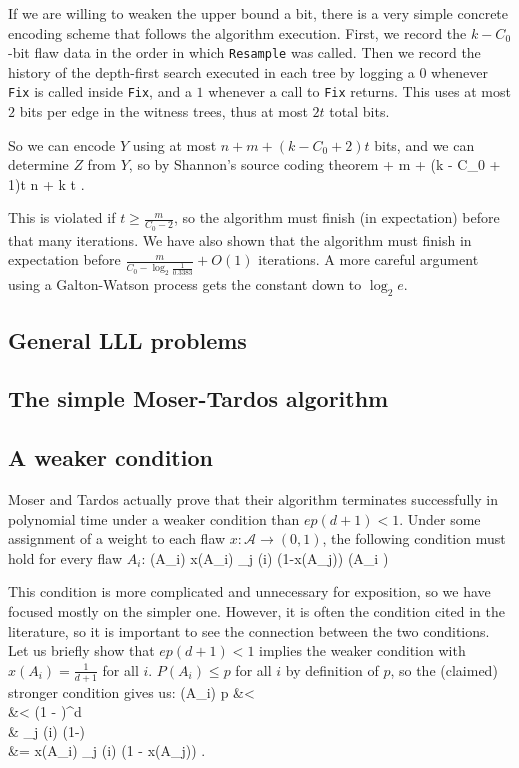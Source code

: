 \documentclass[twocolumn]{article}
\def\seqn#1\eeqn{\begin{align}#1\end{align}}
\begin{document}
If we are willing to weaken the upper bound a bit, there is a very simple concrete encoding scheme that follows the algorithm execution.  First, we record the $k-C_0$-bit flaw data in the order in which \texttt{Resample} was called.  Then we record the history of the depth-first search executed in each tree by logging a $0$ whenever \texttt{Fix} is called inside \texttt{Fix}, and a $1$ whenever a call to \texttt{Fix} returns.  This uses at most $2$ bits per edge in the witness trees, thus at most $2t$ total bits.

So we can encode $Y$ using at most $n + m + (k - C_0 + 2)t$ bits, and we can determine $Z$ from $Y$, so by Shannon's source coding theorem
\seqn
  n + m + (k - C_0 + 1)t \leq n + k t .
\eeqn

This is violated if $t \geq \frac{m}{C_0 - 2}$, so the algorithm must finish (in expectation) before that many iterations.  We have also shown that the algorithm must finish in expectation before $\frac{m}{C_0 - \log_2 \frac{1}{0.3383}} + O(1)$ iterations.  A more careful argument using a Galton-Watson process gets the constant down to $\log_2 e$.

\subsection{General LLL problems}

\subsection{The simple Moser-Tardos algorithm}

\subsection{A weaker condition}
Moser and Tardos actually prove that their algorithm terminates successfully in polynomial time under a weaker condition than $e p (d+1) < 1$.  Under some assignment of a weight to each flaw $x: \mathcal{A} \to (0,1)$, the following condition must hold for every flaw $A_i$:
\seqn
  P(A_i) \leq x(A_i) \prod_{j \in \Gamma(i)} (1-x(A_j)) (\forall A_i \in {}) \label{eqn:general-lll-req}
\eeqn

This condition is more complicated and unnecessary for exposition, so we have  focused mostly on the simpler one.  However, it is often the condition cited in the literature, so it is important to see the connection between the two conditions.  Let us briefly show that $e p (d+1) < 1$ implies the weaker condition with $x(A_i) = \frac{1}{d+1}$ for all $i$.  $P(A_i) \leq p$ for all $i$ by definition of $p$, so the (claimed) stronger condition gives us:
\seqn
  P(A_i) \leq p &<    \\
  &<  (1 - )^d \\
  &\leq {} \prod_{j \in \Gamma(i)} (1-) \\
  &= x(A_i) \prod_{j \in \Gamma(i)} (1 - x(A_j)) .
\eeqn
\end{document}
